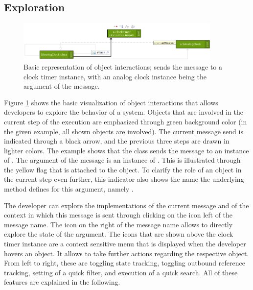 \subsection{Exploration}

\begin{figure}[tb]
	\centering
	\includegraphics[width=0.9\textwidth]{../images/04-ImplExploration1}
	\caption[Basic Representation of Object Interactions]{Basic representation of object interactions;  sends the  message to a clock timer instance, with an analog clock instance being the argument of the message.}
	\label{fig:ImplementationExplorationBasic}
\end{figure}

Figure \ref{fig:ImplementationExplorationBasic} shows the basic visualization of object interactions that allows developers to explore the behavior of a system.
Objects that are involved in the current step of the execution are emphasized through green background color (in the given example, all shown objects are involved).
The current message send is indicated through a black arrow, and the previous three steps are drawn in lighter colors.
The example shows that the class  sends the  message to an instance of .
The argument of the  message is an instance of .
This is illustrated through the yellow flag that is attached to the object.
To clarify the role of an object in the current step even further, this indicator also shows the name the underlying method defines for this argument, namely .

The developer can explore the implementations of the current message and of the context in which this message is sent through clicking on the icon left of the message name.
The icon on the right of the message name allows to directly explore the state of the argument.
The icons that are shown above the clock timer instance are a context sensitive menu that is displayed when the developer hovers an object.
It allows to take further actions regarding the respective object.
From left to right, these are toggling state tracking, toggling outbound reference tracking, setting of a quick filter, and execution of a quick search.
All of these features are explained in the following.

